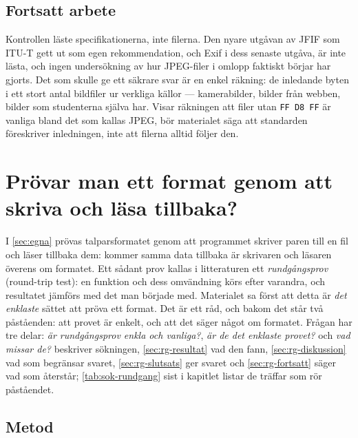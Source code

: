 \section{Fortsatt arbete}
\label{sec:jpeg-fortsatt}

Kontrollen läste specifikationerna, inte filerna.  Den nyare utgåvan av
JFIF som ITU-T gett ut som egen rekommendation, och Exif i dess senaste
utgåva, är inte lästa, och ingen undersökning av hur JPEG-filer i
omlopp faktiskt börjar har gjorts.  Det som skulle ge ett säkrare svar
är en enkel räkning: de inledande byten i ett stort antal bildfiler ur
verkliga källor --- kamerabilder, bilder från webben, bilder som
studenterna själva har.  Visar räkningen att filer utan \texttt{FF D8
FF} är vanliga bland det som kallas JPEG, bör materialet säga att
standarden föreskriver inledningen, inte att filerna alltid följer den.



\chapter{Prövar man ett format genom att skriva och läsa tillbaka?}
\label{app:rundgang}

I \cref{sec:egna} prövas talparsformatet genom att programmet skriver
paren till en fil och läser tillbaka dem: kommer samma data tillbaka är
skrivaren och läsaren överens om formatet.  Ett sådant prov kallas i
litteraturen ett \emph{rundgångsprov} (\foreignlanguage{english}{round-trip
test}): en funktion och dess omvändning körs efter varandra, och
resultatet jämförs med det man började med.  Materialet sa först att
detta är \emph{det enklaste} sättet att pröva ett format.  Det är ett
råd, och bakom det står två påståenden: att provet är enkelt, och att
det säger något om formatet.  Frågan har tre delar: \emph{är
rundgångsprov enkla och vanliga?}, \emph{är de det enklaste provet?}
och \emph{vad missar de?}   beskriver sökningen,
\cref{sec:rg-resultat} vad den fann, \cref{sec:rg-diskussion} vad som
begränsar svaret, \cref{sec:rg-slutsats} ger svaret och
\cref{sec:rg-fortsatt} säger vad som återstår; \cref{tab:sok-rundgang}
sist i kapitlet listar de träffar som rör påståendet.

\section{Metod}
\label{sec:rg-metod}

